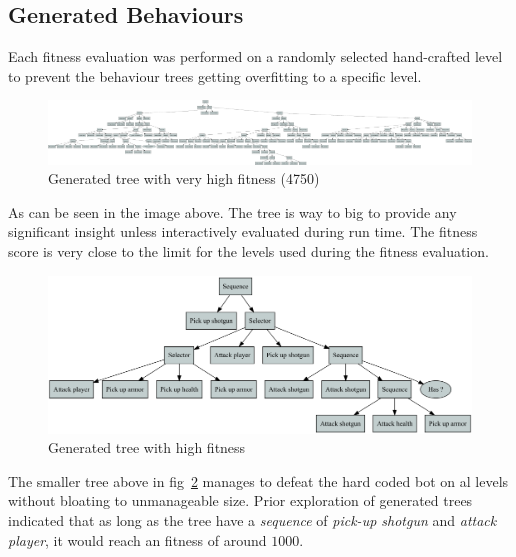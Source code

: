 \documentclass[a4paper, twocolumn]{article}
\begin{document}
        \clearpage

        \subsection{Generated Behaviours} \label{sec:generated_behaviours}

        Each fitness evaluation was performed on a randomly selected hand-crafted level to prevent the behaviour trees getting overfitting to a specific level. 

        \begin{figure}[H]
            \centering
            \includegraphics[width=\linewidth]{share/tree-fitness-4750.png}
            \caption{Generated tree with very high fitness (4750)}
            \label{fig:tree_fitness_4075}
        \end{figure}
        As can be seen in the image above. The tree is way to big to provide any significant insight unless interactively evaluated during run time. The fitness score is very close to the limit for the levels used during the fitness evaluation.

        \begin{figure}[H]
            \centering
            \includegraphics[width=\linewidth]{share/tree-fitness-3780.png}
            \caption{Generated tree with high fitness}
            \label{fig:tree_fitness_3650}
        \end{figure}
        The smaller tree above in fig~\cref{fig:tree_fitness_3650} manages to defeat the hard coded bot on al levels without bloating to unmanageable size. Prior exploration of generated trees indicated that as long as the tree have a \textit{sequence} of \textit{pick-up shotgun} and \textit{attack player}, it would reach an fitness of around \(1000\).
\end{document}
